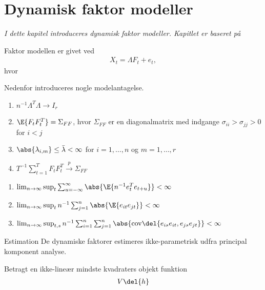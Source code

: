 \chapter{Dynamisk faktor modeller}
\textit{I dette kapitel introduceres dynamisk faktor modeller. Kapitlet er baseret på \citep{stock_watson_2002a}}


Faktor modellen er givet ved
\begin{align}
X_t = \Lambda F_t + e_t,
\end{align}
hvor 

Nedenfor introduceres nogle modelantagelse.
\begin{ass}
\begin{enumerate}
\item \(n^{-1} \Lambda^T \Lambda \rightarrow I_r\)
\item \(\E{F_t F_t^T} = \Sigma_{FF}\), hvor \(\Sigma_{FF}\) er en diagonalmatrix med indgange \(\sigma_{ii} > \sigma_{jj} > 0\) for \(i < j\)
\item \(\abs{\lambda_{i,m}} \leq \bar{\lambda} < \infty\) for \(i = 1, \ldots, n\) og \(m = 1, \ldots, r\)
\item \(T^{-1} \sum_{t=1}^T F_t F_t^T \overset{p}{\rightarrow} \Sigma_{FF}\) 
\end{enumerate}
\end{ass}

\begin{ass}
\begin{enumerate}
\item \(\lim_{n \rightarrow \infty} \sup_t \sum_{u = - \infty}^\infty \abs{\E{n^{-1} e_t^T e_{t+u}}} < \infty\)
\item \(\lim_{n \rightarrow \infty} \sup_t n^{-1} \sum_{j = 1}^n \abs{\E{e_{it} e_{jt}}} < \infty\)
\item \(\lim_{n \rightarrow \infty} \sup_{t,s} n^{-1} \sum_{i=1}^n \sum_{j=1}^n \abs{\text{cov}\del{e_{is} e_{it}, e_{js} e_{jt}}} < \infty\)
\end{enumerate}
\end{ass}

Estimation
De dynamiske faktorer estimeres ikke-parametrisk udfra principal komponent analyse.

Betragt en ikke-lineær mindste kvadraters objekt funktion
\begin{align*}
V \del{h}
\end{align*}









